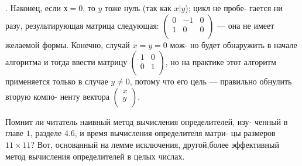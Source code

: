 \documentclass{mai_book}
\begin{document}
\begin{myproof}
. Наконец, если $х = 0$, то $y$ тоже нуль (так как $x | y$); цикл не пробе-\linebreak
гается ни разу, результирующая матрица следующая: ${\left( \begin{array}{ccc}
0 & -1 & 0 \\
1 & 0 & 0 \\
\end{array} \right)}$ \linebreak --- она не имеет желаемой формы. Конечно, случай $x = y = 0$ мож- \linebreak но будет обнаружить в начале алгоритма и тогда ввести матрицу \linebreak ${\left( \begin{array}{ccc}
1 & 0 \\
0 & 1 \\
\end{array} \right)}$, но на практике этот алгоритм применяется только в случае \linebreak $y \ne 0$, потому что его цель --- правильно обнулить вторую компо- \linebreak ненту вектора ${\left( \begin{array}{ccc}
x \\
y \\
\end{array} \right)}$.
\end{myproof}
  Помнит ли читатель наивный метод вычисления определителей, изу- \linebreak ченный в главе $1$, разделе 4.6, и время вычисления определителя матри- \linebreak цы размеров $11 \times 11$? Вот, основанный на лемме исключения, другой,\linebreak более эффективный метод вычисления определителей в целых числах. 
\end{document}
